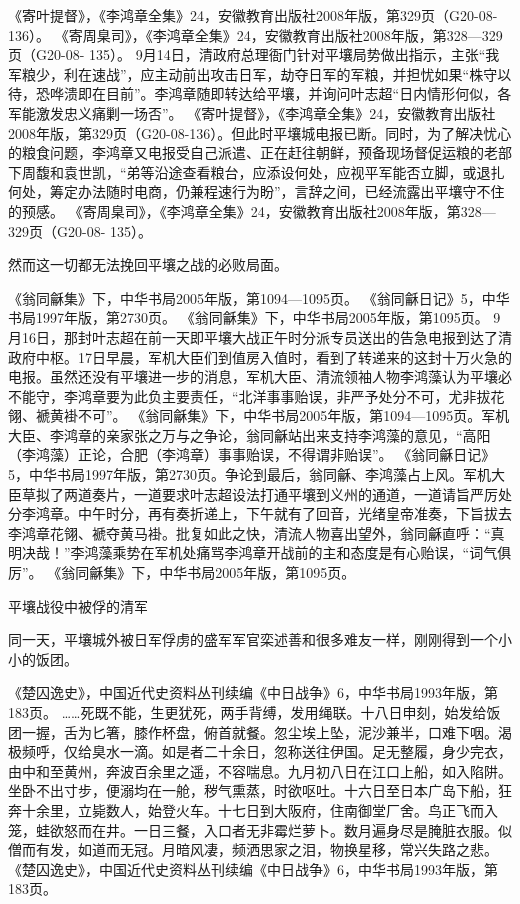 \documentclass[12pt,UTF8]{ctexbook}
\begin{document}
《寄叶提督》，《李鸿章全集》24，安徽教育出版社2008年版，第329页（G20-08-136）。
《寄周臬司》，《李鸿章全集》24，安徽教育出版社2008年版，第328—329页（G20-08- 135）。
9月14日，清政府总理衙门针对平壤局势做出指示，主张“我军粮少，利在速战”，应主动前出攻击日军，劫夺日军的军粮，并担忧如果“株守以待，恐哗溃即在目前”。李鸿章随即转达给平壤，并询问叶志超“日内情形何似，各军能激发忠义痛剿一场否”。 《寄叶提督》，《李鸿章全集》24，安徽教育出版社2008年版，第329页（G20-08-136）。但此时平壤城电报已断。同时，为了解决忧心的粮食问题，李鸿章又电报受自己派遣、正在赶往朝鲜，预备现场督促运粮的老部下周馥和袁世凯，“弟等沿途查看粮台，应添设何处，应视平军能否立脚，或退扎何处，筹定办法随时电商，仍兼程速行为盼”，言辞之间，已经流露出平壤守不住的预感。 《寄周臬司》，《李鸿章全集》24，安徽教育出版社2008年版，第328—329页（G20-08- 135）。

然而这一切都无法挽回平壤之战的必败局面。

《翁同龢集》下，中华书局2005年版，第1094—1095页。
《翁同龢日记》5，中华书局1997年版，第2730页。
《翁同龢集》下，中华书局2005年版，第1095页。
9月16日，那封叶志超在前一天即平壤大战正午时分派专员送出的告急电报到达了清政府中枢。17日早晨，军机大臣们到值房入值时，看到了转递来的这封十万火急的电报。虽然还没有平壤进一步的消息，军机大臣、清流领袖人物李鸿藻认为平壤必不能守，李鸿章要为此负主要责任，“北洋事事贻误，非严予处分不可，尤非拔花翎、褫黄褂不可”。 《翁同龢集》下，中华书局2005年版，第1094—1095页。军机大臣、李鸿章的亲家张之万与之争论，翁同龢站出来支持李鸿藻的意见，“高阳（李鸿藻）正论，合肥（李鸿章）事事贻误，不得谓非贻误”。 《翁同龢日记》5，中华书局1997年版，第2730页。争论到最后，翁同龢、李鸿藻占上风。军机大臣草拟了两道奏片，一道要求叶志超设法打通平壤到义州的通道，一道请旨严厉处分李鸿章。中午时分，再有奏折递上，下午就有了回音，光绪皇帝准奏，下旨拔去李鸿章花翎、褫夺黄马褂。批复如此之快，清流人物喜出望外，翁同龢直呼：“真明决哉！”李鸿藻乘势在军机处痛骂李鸿章开战前的主和态度是有心贻误，“词气俱厉”。 《翁同龢集》下，中华书局2005年版，第1095页。


平壤战役中被俘的清军

同一天，平壤城外被日军俘虏的盛军军官栾述善和很多难友一样，刚刚得到一个小小的饭团。

《楚囚逸史》，中国近代史资料丛刊续编《中日战争》6，中华书局1993年版，第183页。
……死既不能，生更犹死，两手背缚，发用绳联。十八日申刻，始发给饭团一握，舌为匕箸，膝作杯盘，俯首就餐。忽尘埃上坠，泥沙兼半，口难下咽。渴极频呼，仅给臭水一滴。如是者二十余日，忽称送往伊国。足无整履，身少完衣，由中和至黄州，奔波百余里之遥，不容喘息。九月初八日在江口上船，如入陷阱。坐卧不出寸步，便溺均在一舱，秽气熏蒸，时欲呕吐。十六日至日本广岛下船，狂奔十余里，立毙数人，始登火车。十七日到大阪府，住南御堂厂舍。鸟正飞而入笼，蛙欲怒而在井。一日三餐，入口者无非霉烂萝卜。数月遍身尽是腌脏衣服。似僧而有发，如道而无冠。月暗风凄，频洒思家之泪，物换星移，常兴失路之悲。 《楚囚逸史》，中国近代史资料丛刊续编《中日战争》6，中华书局1993年版，第183页。
\end{document}
